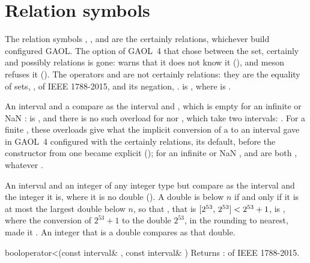 \section{Relation symbols}\label{sec:relational-symbols}
%

The relation symbols \code{<}, \code{<=}, \code{>} and \code{>=} are the
certainly relations, whichever build configured GAOL. The option of GAOL~4
that chose between the set, certainly and possibly relations is gone:  warns that it does not know it
(), and meson refuses it
().\newinvfive{}
The operators \code{==} and \code{!=} are not certainly relations: they are
the equality of sets, ,  of IEEE 1788-2015, and its
negation, .  is
, where  is .

\medskip
An interval and a   compare as the interval and
, which is empty for an infinite or NaN :
 is , and there is no such overload for
\code{==} nor \code{!=}, which take two intervals: .
For a finite , these overloads give what the implicit
conversion of a  to an interval gave in GAOL~4 configured with
the certainly relations, its default, before the constructor from one  became explicit
(); for an infinite or NaN ,  and
 are both , whatever .\newinvfive

\medskip
An interval and an integer  of any integer type but 
compare as the interval and the integer it is, where it is no double
(). A double is below $n$ if and only if it is at most
the largest double below $n$, so that
, that is
$[2^{53},\,2^{53}] < 2^{53}+1$, is , where the conversion of
$2^{53}+1$ to the double $2^{53}$, in the rounding to nearest, made it
. An integer that is a double compares as that
double.\newinvfive

\begin{deffun}{bool}{operator<}{(const interval\& , const interval\& )}
  Returns :  of
  IEEE 1788-2015.
\end{deffun}

